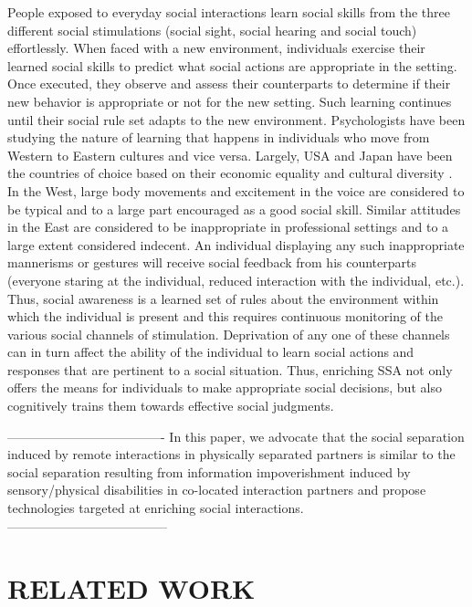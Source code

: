 \documentclass[oneside,11pt]{memoir}
\begin{document}
People exposed to everyday social interactions learn social skills from the three different social stimulations (social sight, social hearing and social touch) effortlessly. When faced with a new environment, individuals exercise their learned social skills to predict what social actions are appropriate in the setting. Once executed, they observe and assess their counterparts to determine if their new behavior is appropriate or not for the new setting. Such learning continues until their social rule set adapts to the new environment. Psychologists have been studying the nature of learning that happens in individuals who move from Western to Eastern cultures and vice versa. Largely, USA and Japan have been the countries of choice based on their economic equality and cultural diversity \cite{rogers_edward_2002}. In the West, large body movements and excitement in the voice are considered to be typical and to a large part encouraged as a good social skill. Similar attitudes in the East are considered to be inappropriate in professional settings and to a large extent considered indecent. An individual displaying any such inappropriate mannerisms or gestures will receive social feedback from his counterparts (everyone staring at the individual, reduced interaction with the individual, etc.).  Thus, social awareness is a learned set of rules about the environment within which the individual is present and this requires continuous monitoring of the various social channels of stimulation. Deprivation of any one of these channels can in turn affect the ability of the individual to learn social actions and responses that are pertinent to a social situation. Thus, enriching SSA not only offers the means for individuals to make appropriate social decisions, but also cognitively trains them towards effective social judgments.

-------------------------------------
In this paper, we advocate that the social separation induced by remote interactions in physically separated partners is similar to the social separation resulting from information impoverishment induced by sensory/physical disabilities in co-located interaction partners and propose technologies targeted at enriching social interactions.
--------------------------------------




\chapter{RELATED WORK}
\end{document}
